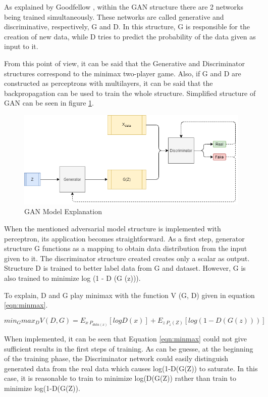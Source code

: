 As explained by Goodfellow \cite{gan}, within the GAN structure there are 2 networks being trained simultaneously. These networks are called generative and discriminative, respectively, G and D. In this structure, G is responsible for the creation of new data, while D tries to predict the probability of the data given as input to it.

From this point of view, it can be said that the Generative and Discriminator structures correspond to the minimax two-player game. Also, if G and D are constructed as perceptrons with multilayers, it can be said that the backpropagation can be used to train the whole structure. Simplified structure of GAN can be seen in figure \ref{fig:ganstruct}.

\begin{figure}[h!]
    \centering
    \includegraphics[scale=0.55]{figures/chapter3/GAN.png}
    \vspace*{3mm}
    \caption{GAN Model Explanation}
    \label{fig:ganstruct}
\end{figure}

When the mentioned adversarial model structure is implemented with perceptron, its application becomes straightforward. As a first step, generator structure G functions as a mapping to obtain data distribution from the input given to it. The discriminator structure created creates only a scalar as output. Structure D is trained to better label data from G and dataset. However, G is also trained to minimize log (1 - D (G (z))).

To explain, D and G play minimax with the function V (G, D) given in equation \ref{eqn:minmax}.

\begin{equation}
\label{eqn:minmax}
    min_Gmax_D V(D,G)= E_{x~P_{data(x)}}[logD(x)]+E_{z~P_{z}(Z)}[log(1-D(G(z)))]
\end{equation}

When implemented, it can be seen that Equation \ref{eqn:minmax} could not give sufficient results in the first steps of training. As can be guesse, at the beginning of the training phase, the Discriminator network could easily distinguish generated data from the real data which causes log(1-D(G(Z)) to saturate. In this case, it is reasonable to train to minimize log(D(G(Z)) rather than train to minimize log(1-D(G(Z)).


